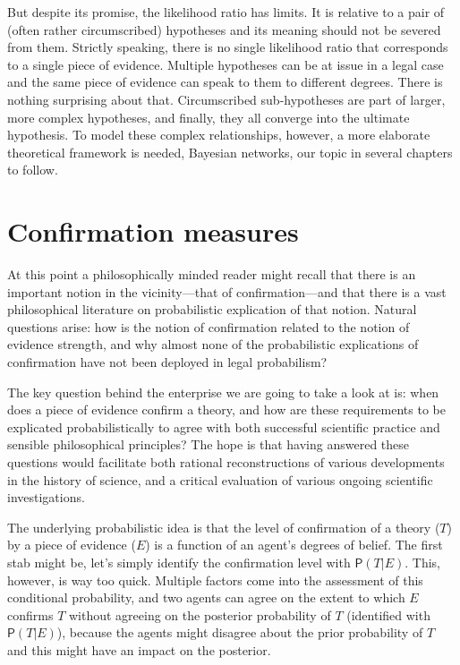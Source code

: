 \documentclass[
  10pt,
  dvipsnames,enabledeprecatedfontcommands]{scrartcl}
\newcommand{\pr}[1]{\mathsf{P}(#1)}
\begin{document}
But despite its promise, the likelihood ratio has limits. It is relative
to a pair of (often rather circumscribed) hypotheses and its meaning
should not be severed from them. Strictly speaking, there is no single
likelihood ratio that corresponds to a single piece of evidence.
Multiple hypotheses can be at issue in a legal case and the same piece
of evidence can speak to them to different degrees. There is nothing
surprising about that. Circumscribed sub-hypotheses are part of larger,
more complex hypotheses, and finally, they all converge into the
ultimate hypothesis. To model these complex relationships, however, a
more elaborate theoretical framework is needed, Bayesian networks, our
topic in several chapters to follow.

\appendix


\section{ Confirmation measures \label{sec:confirmation}}

At this point a philosophically minded reader might recall that there is
an important notion in the vicinity---that of confirmation---and that
there is a vast philosophical literature on probabilistic explication of
that notion. Natural questions arise: how is the notion of confirmation
related to the notion of evidence strength, and why almost none of the
probabilistic explications of confirmation have not been deployed in
legal probabilism?

The key question behind the enterprise we are going to take a look at
is: when does a piece of evidence confirm a theory, and how are these
requirements to be explicated probabilistically to agree with both
successful scientific practice and sensible philosophical principles?
The hope is that having answered these questions would facilitate both
rational reconstructions of various developments in the history of
science, and a critical evaluation of various ongoing scientific
investigations.

The underlying probabilistic idea is that the level of confirmation of a
theory (\(T\)) by a piece of evidence (\(E\)) is a function of an
agent's degrees of belief. The first stab might be, let's simply
identify the confirmation level with \(\pr{T \vert E}\). This, however,
is way too quick. Multiple factors come into the assessment of this
conditional probability, and two agents can agree on the extent to which
\(E\) confirms \(T\) without agreeing on the posterior probability of
\(T\) (identified with \(\pr{T \vert E}\)), because the agents might
disagree about the prior probability of \(T\) and this might have an
impact on the posterior.
\end{document}
